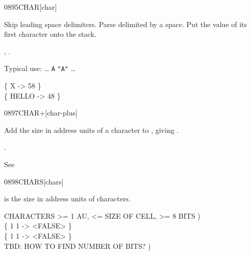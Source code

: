 \begin{worddef}{0895}{CHAR}[char]
\item {}

	Skip leading space delimiters. Parse  delimited by
	a space. Put the value of its first character onto the stack.

\see {},
	.

	\begin{defer}
	\rationale %
		Typical use: {\ldots}
			 \texttt{A}  \texttt{"A"} {\ldots}

	\testing
		\{  X     -> 58 \} \\
		\{  HELLO -> 48 \}
	\end{defer}
\end{worddef}


\begin{worddef}{0897}{CHAR+}[char-plus]
\item {}

	Add the size in address units of a character to
	, giving \param{c-addr_2}.

\see {}.

	\begin{defer}
	\testing
		\rmfamily
		See \rref{core:C,}{C,}
	\end{defer}
\end{worddef}


\begin{worddef}{0898}{CHARS}[chars]
\item {}

	 is the size in address units of \param{n_1}
	characters.

	\begin{defer}
	\testing
		 CHARACTERS >= 1 AU, <= SIZE OF CELL, >= 8 BITS ) \\
		\{ 1  1  -> <FALSE> \} \\
		\{ 1  1   -> <FALSE> \} \\
		 TBD: HOW TO FIND NUMBER OF BITS? )
	\end{defer}
\end{worddef}


